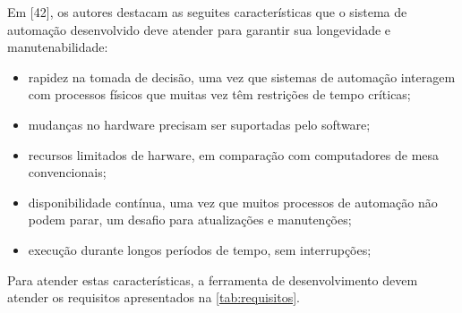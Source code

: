\documentclass[journal]{IEEEtran}
\begin{document}
Em [42], os autores destacam as seguites características que o sistema de automação desenvolvido deve atender para garantir sua longevidade e manutenabilidade:

\begin{itemize}
  \item rapidez na tomada de decisão, uma vez que sistemas de automação interagem com processos físicos que muitas vez têm restrições de tempo críticas;
  \item mudanças no hardware precisam ser suportadas pelo software;
  \item recursos limitados de harware, em comparação com computadores de mesa convencionais;
  \item disponibilidade contínua, uma vez que muitos processos de automação não podem parar, um desafio para atualizações e manutenções;
  \item execução durante longos períodos de tempo, sem interrupções;
\end{itemize}

Para atender estas características, a ferramenta de desenvolvimento devem atender os requisitos apresentados na \autoref{tab:requisitos}.
\end{document}
